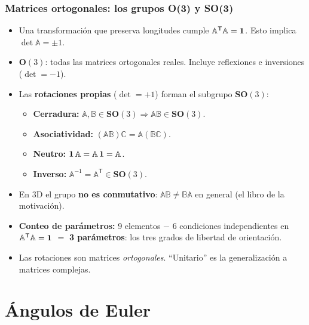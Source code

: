 \documentclass[spanish]{beamer}
\newcommand{\Rot}{\mathbb{A}}                   %
\newcommand{\tr}{\mathsf{T}}                    %
\begin{document}
\begin{frame}
  \frametitle{Matrices ortogonales: los grupos O(3) y SO(3)}
  \begin{itemize}
    \item<1-> Una transformación que preserva longitudes cumple
          $\Rot^{\tr}\Rot=\Id$. Esto implica $\det\Rot=\pm1$.
    \item<2-> $\mathbf{O}(3)$: todas las matrices ortogonales reales. Incluye
          reflexiones e inversiones ($\det=-1$).
    \item<3-> Las \textbf{rotaciones propias} ($\det=+1$) forman el subgrupo
          $\mathbf{SO}(3)$:
      \begin{itemize}
        \item \textbf{Cerradura:} $\Rot,\mathbb{B}\in\mathbf{SO}(3)\Rightarrow\Rot\mathbb{B}\in\mathbf{SO}(3)$.
        \item \textbf{Asociatividad:} $(\Rot\mathbb{B})\mathbb{C}=\Rot(\mathbb{B}\mathbb{C})$.
        \item \textbf{Neutro:} $\Id\,\Rot=\Rot\,\Id=\Rot$.
        \item \textbf{Inverso:} $\Rot^{-1}=\Rot^{\tr}\in\mathbf{SO}(3)$.
      \end{itemize}
    \item<4-> En 3D el grupo \textbf{no es conmutativo}: $\Rot\mathbb{B}\neq\mathbb{B}\Rot$
          en general (el libro de la motivación).
    \item<5-> \textbf{Conteo de parámetros:} 9 elementos $-$ 6 condiciones
          independientes en $\Rot^{\tr}\Rot=\Id$ $=$ \textbf{3 parámetros}: los tres
          grados de libertad de orientación.
    \item<6-> Las rotaciones son matrices \emph{ortogonales}. ``Unitario'' es la
          generalización a matrices complejas.
  \end{itemize}
\end{frame}

\section{Ángulos de Euler}
\end{document}
